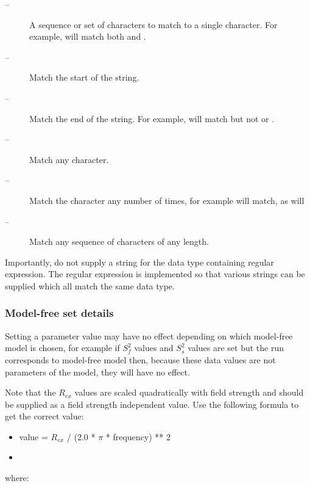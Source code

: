  \begin{description} 
 \item[\quotecmd{[]} --]  A sequence or set of characters to match to a single character.  For example,  will match both  and .  
 \item[\quotecmd{\^{}} --]  Match the start of the string.  
 \item[\quotecmd{\$} --]  Match the end of the string.  For example,  will match  but not  or .  
 \item[ --]  Match any character.  
 \item[ --]  Match the character  any number of times, for example  will match, as will   
 \item[ --]  Match any sequence of characters of any length.  
 \end{description} 
  

 Importantly, do not supply a string for the data type containing regular expression.  The regular expression is implemented so that various strings can be supplied which all match the same data type. 
  

  
 \subsubsection{Model-free set details} 

 Setting a parameter value may have no effect depending on which model-free model is chosen, for example if $S^2_f$ values and $S^2_s$ values are set but the run corresponds to model-free model  then, because these data values are not parameters of the model, they will have no effect. 
  

 Note that the $R_{ex}$ values are scaled quadratically with field strength and should be supplied as a field strength independent value.  Use the following formula to get the correct value: 
  

 \begin{itemize} 
 \item[] value = $R_{ex}$ / (2.0 * $\pi$ * frequency) ** 2  
 \item[]  
 \end{itemize} 
  

 where: 
  

